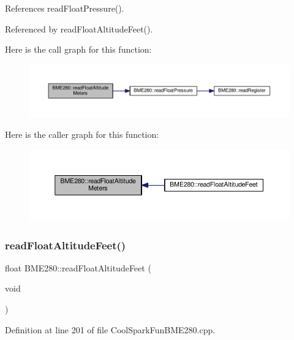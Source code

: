 References read\+Float\+Pressure().



Referenced by read\+Float\+Altitude\+Feet().

Here is the call graph for this function\+:
\nopagebreak
\begin{figure}[H]
\begin{center}
\leavevmode
\includegraphics[width=350pt]{df/dcf/class_b_m_e280_af67b56ba50760ee1d116acc6c5010221_cgraph}
\end{center}
\end{figure}
Here is the caller graph for this function\+:
\nopagebreak
\begin{figure}[H]
\begin{center}
\leavevmode
\includegraphics[width=350pt]{df/dcf/class_b_m_e280_af67b56ba50760ee1d116acc6c5010221_icgraph}
\end{center}
\end{figure}
\mbox{\label{class_b_m_e280_a6525c8a26f887b52596c86bed99343cb}} 
\subsubsection{\texorpdfstring{read\+Float\+Altitude\+Feet()}{readFloatAltitudeFeet()}}
{\footnotesize\ttfamily float B\+M\+E280\+::read\+Float\+Altitude\+Feet (\begin{DoxyParamCaption}\item[{void}]{ }\end{DoxyParamCaption})}



Definition at line 201 of file Cool\+Spark\+Fun\+B\+M\+E280.\+cpp.



